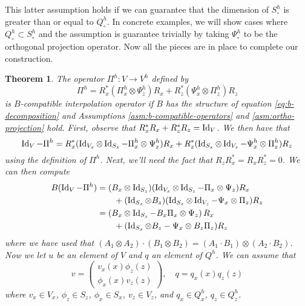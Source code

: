 \documentclass{article}
\theoremstyle{definition}
\theoremstyle{plain}
\newtheorem{thm}{Theorem}
\newcommand{\Id}[1]{\operatorname{Id} #1}
\begin{document}
This latter assumption holds if we can guarantee that the dimension of $S_\circ^h$ is greater than or equal to $Q_\circ^h$.
In concrete examples, we will show cases where $Q_\circ^h \subset S_\circ^h$ and the assumption is guarantee trivially by taking $\Psi_\circ^h$ to be the orthogonal projection operator.
Now all the pieces are in place to complete our construction.
\begin{thm}\label{thm:main-theorem} The operator $\Pi^h : V \to V^h$ defined by
\begin{equation}
    \Pi^h = R_x^*(\Pi_x^h\otimes\Psi_z^h)R_x + R_z^*(\Psi_x^h\otimes\Pi_z^h)R_z
\end{equation}
    is $B$-compatible interpolation operator if $B$ has the structure of equation \eqref{eq:b-decomposition} and Assumptions \ref{asm:b-compatible-operators} and \ref{asm:ortho-projection} hold.
    \proof First, observe that $R_x^*R_x + R_z^*R_z = \Id_V$.
    We then have that
    \begin{equation}
        \Id_V - \Pi^h = R_x^*(\Id_{V_x}\otimes\Id_{S_z} - \Pi_x^h\otimes\Psi_z^h)R_x + R_z^*(\Id_{S_x}\otimes\Id_{V_z} - \Psi_x^h\otimes\Pi_z^h)R_z
    \end{equation}
    using the definition of $\Pi^h$.
    Next, we'll need the fact that $R_zR_x^* = R_xR_z^* = 0$.
    We can then compute
    \begin{align}
        B(\Id_V - \Pi^h) & = (B_x\otimes \Id_{S_z})(\Id_{V_x}\otimes\Id_{S_z} - \Pi_x\otimes\Psi_z)R_x \nonumber\\
        & \qquad + (\Id_{S_x}\otimes B_z)(\Id_{S_x}\otimes\Id_{V_z} - \Psi_x\otimes\Pi_z)R_z \\
        & = \left(B_x\otimes\Id_{S_z} - B_x\Pi_x\otimes\Psi_z\right)R_x \nonumber \\
        & \qquad + (\Id_{S_x}\otimes B_z - \Psi_x\otimes B_z\Pi_z)R_z
        \label{eq:b-id-pi}
    \end{align}
    where we have used that $(A_1\otimes A_2)\cdot(B_1\otimes B_2) = (A_1\cdot B_1)\otimes(A_2\cdot B_2)$.
    Now we let $u$ be an element of $V$ and $q$ an element of $Q^h$.
    We can assume that
    \begin{equation}
        v = \left(\begin{matrix}v_x(x)\phi_z(z) \\ \phi_x(x)v_z(z)\end{matrix}\right), \quad q = q_x(x)q_z(z)
    \end{equation}
    where $v_x \in V_x$, $\phi_z \in S_z$, $\phi_x \in S_x$, $v_z \in V_z$, and $q_x \in Q_x^h$, $q_z \in Q_z^h$.

\end{thm}
\end{document}
